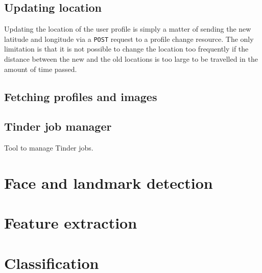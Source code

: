 


\subsection{Updating location}
Updating the location of the user profile is simply a matter of sending the new latitude and longitude 
via a \texttt{POST} request to a profile change resource. The only limitation is that it is not possible to change the location too
frequently if the distance between the new and the old locations is too large to be travelled in the amount of time passed.

\subsection{Fetching profiles and images}

\subsection{Tinder job manager}
Tool to manage Tinder jobs.

\section{Face and landmark detection}

\section{Feature extraction}

\section{Classification}

